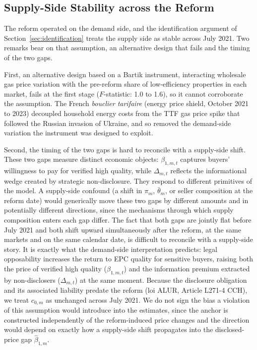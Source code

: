 
\subsection*{Supply-Side Stability across the Reform}
\label{app:supply_stability}

The reform operated on the demand side, and the identification argument of Section~\ref{sec:identification} treats the supply side as stable across July 2021. Two remarks bear on that assumption, an alternative design that fails and the timing of the two gaps.

First, an alternative design based on a Bartik instrument, interacting wholesale gas price variation with the pre-reform share of low-efficiency properties in each market, fails at the first stage ($F$-statistic: 1.0 to 1.6), so it cannot corroborate the assumption. The French \emph{bouclier tarifaire} (energy price shield, October 2021 to 2023) decoupled household energy costs from the TTF gas price spike that followed the Russian invasion of Ukraine, and so removed the demand-side variation the instrument was designed to exploit.

Second, the timing of the two gaps is hard to reconcile with a supply-side shift. These two gaps measure distinct economic objects: $\beta_{1,m,t}$ captures buyers' willingness to pay for verified high quality, while $\Delta_{m,t}$ reflects the informational wedge created by strategic non-disclosure. They respond to different primitives of the model. A supply-side confound (a shift in $\pi_m$, $\bar\theta_m$, or seller composition at the reform date) would generically move these two gaps by different amounts and in potentially different directions, since the mechanisms through which supply composition enters each gap differ. The fact that both gaps are jointly flat before July 2021 and both shift upward simultaneously after the reform, at the same markets and on the same calendar date, is difficult to reconcile with a supply-side story. It is exactly what the demand-side interpretation predicts: legal opposability increases the return to EPC quality for sensitive buyers, raising both the price of verified high quality ($\beta_{1,m,t}$) and the information premium extracted by non-disclosers ($\Delta_{m,t}$) at the same moment. Because the disclosure obligation and its associated liability predate the reform (loi ALUR, Article L271-4 CCH), we treat $c_{0,m}$ as unchanged across July 2021. We do not sign the bias a violation of this assumption would introduce into the estimates, since the anchor is constructed independently of the reform-induced price changes and the direction would depend on exactly how a supply-side shift propagates into the disclosed-price gap $\hat\beta_{1,m}$.

